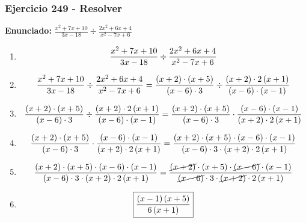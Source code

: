 \documentclass[11pt,a4paper]{article}
\newcommand{\fitmath}[1]{%
\[
\setbox0=\hbox{$\displaystyle #1$}%
\ifdim\wd0>\linewidth
\resizebox{\linewidth}{!}{$\displaystyle #1$}%
\else
#1%
\fi
\]
}
\begin{document}
\subsubsection*{Ejercicio 249 - Resolver}
\textbf{Enunciado:} $ \frac{x^{2} + 7 x + 10}{3 x - 18} \div \frac{2 x^{2} + 6 x + 4}{x^{2} - 7 x + 6} $\par
\begin{enumerate}[leftmargin=2em]
\item \fitmath{\frac{x^{2} + 7 x + 10}{3 x - 18} \div \frac{2 x^{2} + 6 x + 4}{x^{2} - 7 x + 6}}
\item \fitmath{\frac{x^{2} + 7 x + 10}{3 x - 18} \div \frac{2 x^{2} + 6 x + 4}{x^{2} - 7 x + 6}= \frac{\left(x + 2\right)\cdot \left(x + 5\right)}{\left(x - 6\right)\cdot 3} \div \frac{\left(x + 2\right)\cdot 2 \left(x + 1\right)}{\left(x - 6\right)\cdot \left(x - 1\right)}}
\item \fitmath{\frac{\left(x + 2\right)\cdot \left(x + 5\right)}{\left(x - 6\right)\cdot 3}\div \frac{\left(x + 2\right)\cdot 2 \left(x + 1\right)}{\left(x - 6\right)\cdot \left(x - 1\right)}= \frac{\left(x + 2\right)\cdot \left(x + 5\right)}{\left(x - 6\right)\cdot 3}\cdot \frac{\left(x - 6\right)\cdot \left(x - 1\right)}{\left(x + 2\right)\cdot 2 \left(x + 1\right)}}
\item \fitmath{\frac{\left(x + 2\right)\cdot \left(x + 5\right)}{\left(x - 6\right)\cdot 3}\cdot \frac{\left(x - 6\right)\cdot \left(x - 1\right)}{\left(x + 2\right)\cdot 2 \left(x + 1\right)}= \frac{\left(x + 2\right)\cdot \left(x + 5\right)\cdot \left(x - 6\right)\cdot \left(x - 1\right)}{\left(x - 6\right)\cdot 3\cdot \left(x + 2\right)\cdot 2 \left(x + 1\right)}}
\item \fitmath{\frac{\left(x + 2\right)\cdot \left(x + 5\right)\cdot \left(x - 6\right)\cdot \left(x - 1\right)}{\left(x - 6\right)\cdot 3\cdot \left(x + 2\right)\cdot 2 \left(x + 1\right)}= \frac{\cancel{\left(x + 2\right)}\cdot \left(x + 5\right)\cdot \cancel{\left(x - 6\right)}\cdot \left(x - 1\right)}{\cancel{\left(x - 6\right)}\cdot 3\cdot \cancel{\left(x + 2\right)}\cdot 2 \left(x + 1\right)}}
\item \fitmath{\boxed{\frac{\left(x - 1\right) \left(x + 5\right)}{6 \left(x + 1\right)}}}
\end{enumerate}

\vspace{0.12cm}
\end{document}
